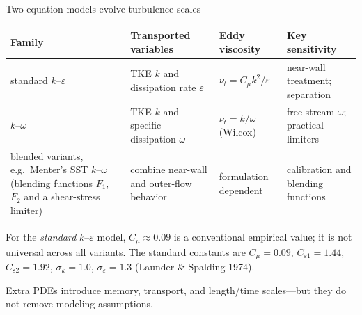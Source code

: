 \documentclass[aspectratio=169,11pt]{beamer}
\begin{document}
\begin{frame}{Two-equation models evolve turbulence scales}
\footnotesize
\setlength{\tabcolsep}{3pt}
\begin{tabular}{@{}L{0.18\textwidth}L{0.25\textwidth}L{0.20\textwidth}L{0.22\textwidth}@{}}
\toprule
\textbf{Family} & \textbf{Transported variables} & \textbf{Eddy viscosity} & \textbf{Key sensitivity}\\
\midrule
standard $k$--$\varepsilon$ & TKE $k$ and dissipation rate $\varepsilon$ & $\nu_t=C_\mu k^2/\varepsilon$ & near-wall treatment; separation\\[5pt]
$k$--$\omega$ & TKE $k$ and specific dissipation $\omega$ & $\nu_t=k/\omega$ (Wilcox) & free-stream $\omega$; practical limiters\\[5pt]
blended variants, e.g.\ Menter's SST $k$--$\omega$ (blending functions $F_1$, $F_2$ and a shear-stress limiter) & combine near-wall and outer-flow behavior & formulation dependent & calibration and blending functions\\
\bottomrule
\end{tabular}

\vspace{0.4em}
For the \emph{standard} $k$--$\varepsilon$ model, $C_\mu\approx0.09$ is a conventional empirical value; it is not universal across all variants.
The standard constants are $C_\mu=0.09$, $C_{\varepsilon1}=1.44$, $C_{\varepsilon2}=1.92$, $\sigma_k=1.0$, $\sigma_\varepsilon=1.3$ (Launder \& Spalding 1974).

\begin{punchbox}
Extra PDEs introduce memory, transport, and length/time scales---but they do not remove modeling assumptions.
\end{punchbox}
\end{frame}
\end{document}

